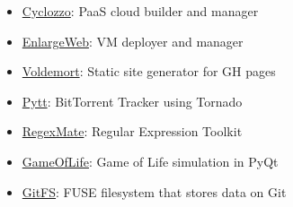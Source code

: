 \documentclass[10pt,a4paper,ragged2e,withhyper]{altacv}
\begin{document}
\begin{paracol}{2}
	
	
	\begin{itemize}
		\item \href{https://github.com/cyclozzo/cyclozzo}{Cyclozzo}: PaaS cloud builder and manager
		\item \href{https://code.google.com/archive/p/enlargeweb}{EnlargeWeb}: VM deployer and manager
		\item \href{https://github.com/semk/voldemort}{Voldemort}: Static site generator for GH pages
		\item \href{https://github.com/semk/Pytt}{Pytt}: BitTorrent Tracker using Tornado
		\item \href{https://github.com/semk/RegexMate}{RegexMate}: Regular Expression Toolkit
		\item \href{https://github.com/semk/GameOfLife}{GameOfLife}: Game of Life simulation in PyQt
		\item \href{https://github.com/semk/GitFS}{GitFS}: FUSE filesystem that stores data on Git
	\end{itemize}
	
	
\end{paracol}
\end{document}
